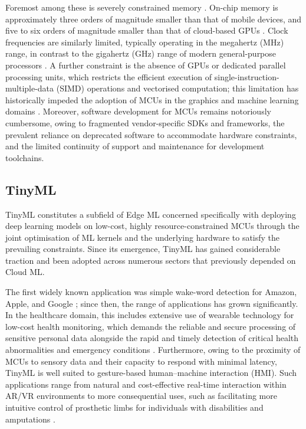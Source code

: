 \documentclass[12pt,DIV16,BCOR12mm,a4paper,footinclude=false,headinclude,parskip=half-,twoside,openright,cleardoublepage=empty,toc=index,bibliography=totoc,listof=totoc]{scrreprt}
\numberwithin{equation}{chapter}
\begin{document}
    Foremost among these is severely constrained memory \cite{yelchuriReviewTinyML2022}.
    On-chip memory is approximately three orders of magnitude smaller than that of mobile devices, and five to six orders of magnitude smaller than that of
    cloud-based GPUs \cite{linMCUNetTinyDeep2020}.
    Clock frequencies are similarly limited, typically operating in the megahertz (MHz) range, in contrast to the gigahertz (GHz) range of modern
    general-purpose processors \cite{linTinyMachineLearning2024}. A further constraint is the absence of GPUs or dedicated parallel processing units, which restricts the efficient execution
    of single-instruction-multiple-data (SIMD) operations and vectorised computation; this limitation has historically impeded the adoption of MCUs in the
    graphics and machine learning domains \cite{linTinyMachineLearning2024}. Moreover, software development for MCUs remains notoriously cumbersome, owing to fragmented vendor-specific SDKs
    and frameworks, the prevalent reliance on deprecated software to accommodate hardware constraints, and the limited continuity of support and maintenance
    for development toolchains.

    
    
    
    \subsection{TinyML}

    TinyML constitutes a subfield of Edge ML concerned specifically with deploying
    deep learning models on low-cost, highly resource-constrained MCUs through the
    joint optimisation of ML kernels and the underlying hardware to satisfy the
    prevailing constraints. Since its emergence, TinyML has gained considerable
    traction and been adopted across numerous sectors that previously depended on
    Cloud ML.

    The first widely known application was simple wake-word detection for Amazon,
    Apple, and Google \cite{davidTensorFlowLiteMicro2021}; since then, the range of
    applications has grown significantly. In the healthcare domain, this includes
    extensive use of wearable technology for low-cost health monitoring, which
    demands the reliable and secure processing of sensitive personal data alongside
    the rapid and timely detection of critical health abnormalities and emergency
    conditions \cite{yelchuriReviewTinyML2022,linTinyMachineLearning2024}.
    Furthermore, owing to the proximity of MCUs to sensory data and their capacity
    to respond with minimal latency, TinyML is well suited to gesture-based
    human--machine interaction (HMI). Such applications range from natural and
    cost-effective real-time interaction within AR/VR environments to more
    consequential uses, such as facilitating more intuitive control of prosthetic
    limbs for individuals with disabilities and amputations
    \cite{linMCUNetTinyDeep2020}.
\end{document}
